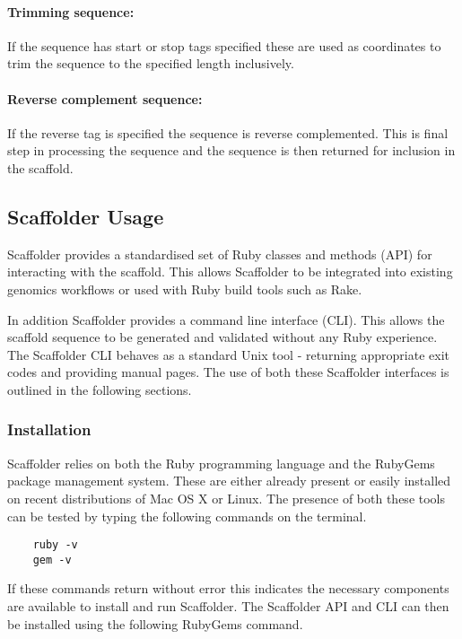 \documentclass[10pt]{bmc_article}
\newenvironment{bmcformat}{\begin{raggedright}\baselineskip20pt\sloppy\setboolean{publ}{false}}{\end{raggedright}\baselineskip20pt\sloppy}
\begin{document}
\begin{bmcformat}
\paragraph{Trimming sequence:} If the sequence has start or stop tags
specified these are used as coordinates to trim the sequence to the specified
length inclusively. \pb 

\paragraph{Reverse complement sequence:} If the reverse tag is specified the
sequence is reverse complemented. This is final step in processing the
sequence and the sequence is then returned for inclusion in the scaffold. \pb

\subsection*{Scaffolder Usage} %

Scaffolder provides a standardised set of Ruby classes and methods (API) for
interacting with the scaffold. This allows Scaffolder to be integrated into
existing genomics workflows or used with Ruby build tools such as Rake. \pb

In addition Scaffolder provides a command line interface (CLI). This allows
the scaffold sequence to be generated and validated without any Ruby
experience. The Scaffolder CLI behaves as a standard Unix tool - returning
appropriate exit codes and providing manual pages. The use of both these
Scaffolder interfaces is outlined in the following sections. \pb

\subsubsection*{Installation} %

Scaffolder relies on both the Ruby programming language and the RubyGems
package management system. These are either already present or easily installed
on recent distributions of Mac OS X or Linux. The presence of both these tools
can be tested by typing the following commands on the terminal. \pb

  \begin{verbatim}
    ruby -v
    gem -v
  \end{verbatim}

If these commands return without error this indicates the necessary components
are available to install and run Scaffolder. The Scaffolder API and CLI can
then be installed using the following RubyGems command. \pb


\end{bmcformat}
\end{document}
